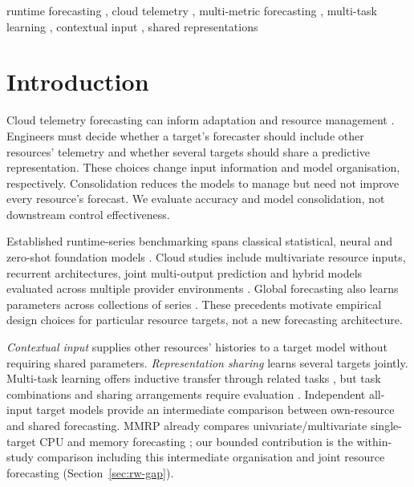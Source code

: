 \documentclass[a4paper,fleqn]{cas-dc}
\begin{document}
\begin{keywords}
runtime forecasting \sep
cloud telemetry \sep
multi-metric forecasting \sep
multi-task learning \sep
contextual input \sep
shared representations
\end{keywords}

\maketitle

\section{Introduction}
\label{sec:introduction}

Cloud telemetry forecasting can inform adaptation and resource management
\citep{Taherizadeh2018Monitoring,Bauer2020SelfAware}.
Engineers must decide whether a target's forecaster should include other
resources' telemetry and whether several targets should share a predictive
representation. These choices change input information and model organisation,
respectively. Consolidation reduces the models to manage but need not improve
every resource's forecast. We evaluate accuracy and model consolidation,
not downstream control effectiveness.

Established runtime-series benchmarking spans
classical statistical, neural and zero-shot foundation models
\citep{DiMenna2026RuntimeForecasting}. Cloud studies include multivariate
resource inputs, recurrent architectures, joint multi-output prediction and
hybrid models evaluated across multiple provider environments
\citep{Ullah2023CloudBiLSTM,Tripathi2025MMRP}. Global forecasting also learns
parameters across collections of series \citep{Salinas2020DeepAR}.
These precedents motivate empirical design choices for particular resource
targets, not a new forecasting architecture.

\emph{Contextual input} supplies other resources' histories to a target model
without requiring shared parameters. \emph{Representation sharing} learns
several targets jointly. Multi-task learning
offers inductive transfer through related tasks \citep{Caruana1997Multitask},
but task combinations and sharing arrangements require evaluation
\citep{Standley2020TaskGrouping,Fifty2021TaskGroupings,Nochumsohn2025MTLinear}.
Independent all-input target models provide an intermediate comparison
between own-resource and shared forecasting. MMRP already compares
univariate/multivariate single-target CPU and memory forecasting
\citep{Tripathi2025MMRP}; our bounded contribution is the within-study
comparison including this intermediate organisation and joint resource
forecasting (Section~\ref{sec:rw-gap}).
\end{document}
